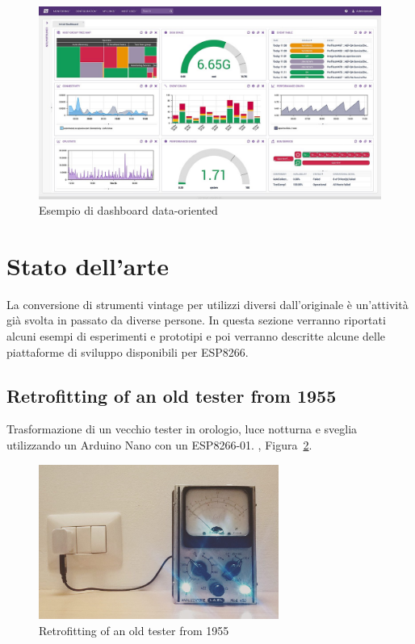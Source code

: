 \documentclass[12pt,a4paper]{report}
\begin{document}
\begin{figure}[h]
  \centering
  \includegraphics[width=\textwidth]{datadash}
  \caption{Esempio di dashboard data-oriented \cite{wiki:datadash}}
  \label{fig:datadash}
\end{figure}

\section{Stato dell'arte}
La conversione di strumenti vintage per utilizzi diversi dall'originale è un'attività già svolta in passato da diverse persone. In questa
sezione verranno riportati alcuni esempi di esperimenti e prototipi e poi verranno descritte alcune delle piattaforme di sviluppo disponibili
per ESP8266.


\subsection{Retrofitting of an old tester from 1955}
Trasformazione di un vecchio tester in orologio, luce notturna e sveglia utilizzando un Arduino Nano con un ESP8266-01. 
\cite{retrofit1955}, Figura~\ref{fig:retrofit1955}.

\begin{figure}[h]
  \centering
  \includegraphics[width=0.7\textwidth]{retrofit1955}
  \caption{Retrofitting of an old tester from 1955 \cite{retrofit1955}}
  \label{fig:retrofit1955}
\end{figure}
\end{document}
